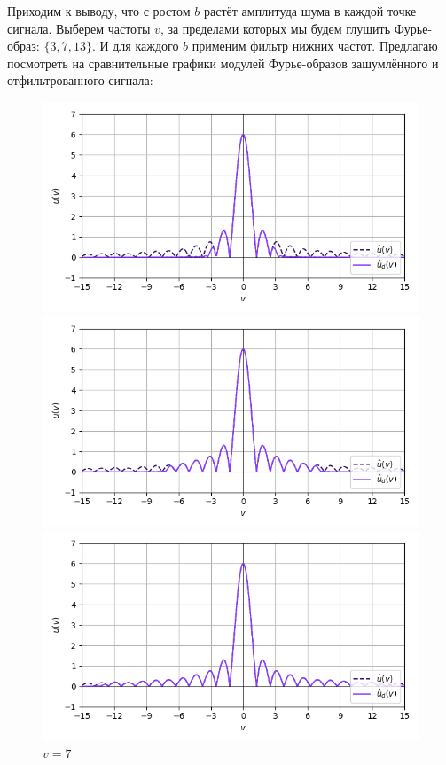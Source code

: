 \documentclass[a4paper]{article}
\begin{document}
Приходим к выводу, что с ростом $b$ растёт амплитуда шума в каждой точке сигнала.\newpage
Выберем частоты $v$, за пределами которых мы будем глушить Фурье-образ: $\{3, 7, 13\}$. И для каждого $b$ применим фильтр нижних частот. Предлагаю посмотреть на сравнительные графики модулей Фурье-образов зашумлённого и отфильтрованного сигнала:
\begin{figure}[H]
    \begin{minipage}{0.33\textwidth}
        \centering \includegraphics[width=\textwidth]{sources/low-pass filter/fourier (b=0.5, v=3).png}
        \caption{$v = 3$}
    \end{minipage}\hfill
    \begin{minipage}{0.33\textwidth}
        \centering \includegraphics[width=\textwidth]{sources/low-pass filter/fourier (b=0.5, v=7).png}
        \caption{$v = 7$}
    \end{minipage}\hfill
    \begin{minipage}{0.33\textwidth}
        \centering \includegraphics[width=\textwidth]{sources/low-pass filter/fourier (b=0.5, v=13).png}

\end{minipage}
\end{figure}
\end{document}
